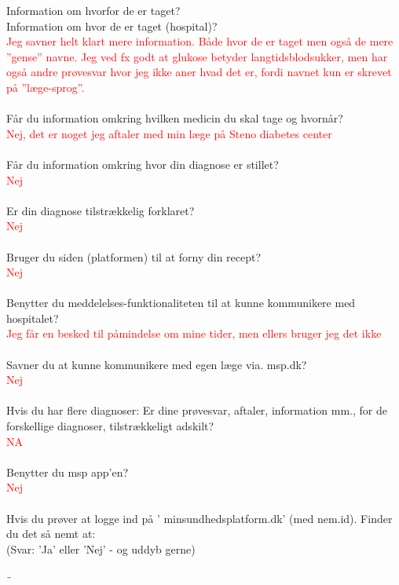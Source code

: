              Information om hvorfor de er taget?  \\
             Information om hvor de er taget (hospital)?\\
\textcolor{red}{Jeg savner helt klart mere information. Både hvor de er taget men også de mere ”gense” navne. Jeg ved fx godt at glukose betyder langtidsblodsukker, men har også andre prøvesvar hvor jeg ikke aner hvad det er, fordi navnet kun er skrevet på ”læge-sprog”.}
\\ \\
Får du information omkring hvilken medicin du skal tage og hvornår?\\
\textcolor{red}{Nej, det er noget jeg aftaler med min læge på Steno diabetes center}
\\ \\
Får du information omkring hvor din diagnose er stillet?\\
\textcolor{red}{Nej}
\\ \\
Er din diagnose tilstrækkelig forklaret?\\
\textcolor{red}{Nej}
\\ \\
Bruger du siden (platformen) til at forny din recept?\\
\textcolor{red}{Nej}
\\ \\
Benytter du meddelelses-funktionaliteten til at kunne kommunikere med hospitalet?\\
\textcolor{red}{Jeg får en besked til påmindelse om mine tider, men ellers bruger jeg det ikke}
\\ \\
Savner du at kunne kommunikere med egen læge via. msp.dk?\\
\textcolor{red}{Nej}
\\ \\
Hvis du har flere diagnoser: Er dine prøvesvar, aftaler, information mm., for de forskellige diagnoser, tilstrækkeligt adskilt?\\
\textcolor{red}{NA}
\\ \\
Benytter du msp app’en?\\
\textcolor{red}{Nej}
\\ \\
Hvis du prøver at logge ind på ’ minsundhedsplatform.dk’ (med nem.id). Finder du det så nemt at:\\
(Svar: ’Ja’ eller ’Nej’ - og uddyb gerne)
\\ \\¨

